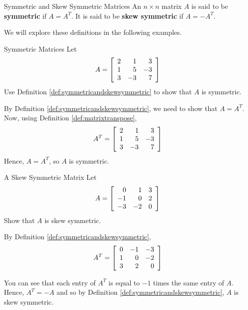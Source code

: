 \begin{definition}{Symmetric and Skew Symmetric Matrices}\label{def:symmetricandskewsymmetric}
An $n\times n$ matrix $A$ is said to be
\textbf{symmetric} if $A=A^{T}.$ It is said to be
 \textbf{skew symmetric} if $A=-A^{T}.$
\end{definition}

We will explore these definitions in the following examples.

\begin{example}{Symmetric Matrices}\label{exa:symmetricmatrix}
Let
\begin{equation*}
A=\left[
\begin{array}{rrr}
2 & 1 & 3 \\
1 & 5 & -3 \\
3 & -3 & 7
\end{array}
\right] 
\end{equation*}
Use Definition \ref{def:symmetricandskewsymmetric} to show that $A$ is symmetric. 
\end{example}

\begin{solution}
By Definition \ref{def:symmetricandskewsymmetric}, we need to show that $A = A^T$. 
Now, using Definition \ref{def:matrixtranspose}, 
\begin{equation*}
A^{T} = \left[
\begin{array}{rrr}
2 & 1 & 3 \\
1 & 5 & -3 \\
3 & -3 & 7
\end{array}
\right]
\end{equation*}
Hence, $A = A^{T}$, so $A$ is symmetric.
\end{solution}

\begin{example}{A Skew Symmetric Matrix}\label{exa:skewsymmetricmatrix}
Let
\begin{equation*}
A=\left[
\begin{array}{rrr}
0 & 1 & 3 \\
-1 & 0 & 2 \\
-3 & -2 & 0
\end{array}
\right] 
\end{equation*}
Show that $A$ is skew symmetric.
\end{example}

\begin{solution} By Definition \ref{def:symmetricandskewsymmetric}, 
\begin{equation*}
A^{T} = \left[
\begin{array}{rrr}
0 & -1 & -3\\
1 &  0 & -2\\
3 &  2 &  0
\end{array}
\right] 
\end{equation*}

You can see that each entry of $A^T$ is equal to $-1$ times the same entry of $A$. 
Hence, $A^{T} = - A$ and so by Definition \ref{def:symmetricandskewsymmetric}, $A$ is skew symmetric. 
\end{solution}